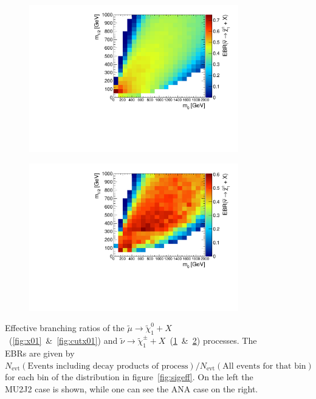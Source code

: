 \begin{figure}[ht!]
  \begin{subfigure}[b]{0.495\textwidth}
    \centering
    \includegraphics[width=\textwidth]{plots/hXplus1NeutRatio.pdf}
    \caption{\label{fig:xplus1neut}}
  \end{subfigure}
  \begin{subfigure}[b]{0.495\textwidth}
    \centering
    \includegraphics[width=\textwidth]{plots/hCutXplus1NeutRatio.pdf}
    \caption{\label{fig:cutxplus1neut}}
  \end{subfigure}
  \caption{Effective branching ratios of the $\tilde{\mu} \rightarrow \tilde{\chi}^0_1 + X$~(\ref{fig:x01}~\&~\ref{fig:cutx01}) and $\tilde{\nu} \rightarrow \tilde{\chi}^\pm_1 + X$~(\ref{fig:xplus1neut}~\&~\ref{fig:cutxplus1neut}) processes. The EBRs are given by $N_{\text{evt}}(\text{Events including decay products of process}) / N_{\text{evt}}(\text{All events for that bin})$ for each bin of the distribution in figure~\ref{fig:sigeff}. On the left the MU2J2 case is shown, while one can see the ANA case on the right.}
  \label{fig:x01sneuxplusratio}
\end{figure}

